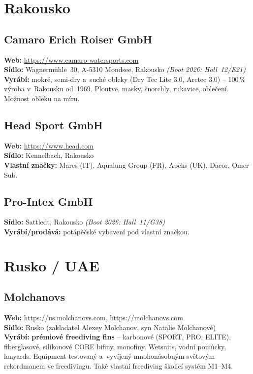 \documentclass[11pt,a4paper]{article}
\begin{document}
\section{Rakousko}

\subsection{Camaro Erich Roiser GmbH}
\textbf{Web:} \url{https://www.camaro-watersports.com} \\
\textbf{Sídlo:} Wagnermühle~30, A-5310 Mondsee, Rakousko \quad\emph{(Boot 2026: Hall~12/E21)} \\
\textbf{Vyrábí:} mokré, semi-dry a~suché obleky (Dry Tec Lite 3.0, Arctec 3.0) -- 100\,\% výroba v~Rakousku od~1969. Ploutve, masky, šnorchly, rukavice, oblečení. Možnost obleku na míru.

\subsection{Head Sport GmbH}
\textbf{Web:} \url{https://www.head.com} \\
\textbf{Sídlo:} Kennelbach, Rakousko \\
\textbf{Vlastní značky:} Mares (IT), Aqualung Group (FR), Apeks (UK), Dacor, Omer Sub.

\subsection{Pro-Intex GmbH}
\textbf{Sídlo:} Sattledt, Rakousko \quad\emph{(Boot 2026: Hall~11/G38)} \\
\textbf{Vyrábí/prodává:} potápěčské vybavení pod vlastní značkou.

\section{Rusko / UAE}

\subsection{Molchanovs}
\textbf{Web:} \url{https://us.molchanovs.com}, \url{https://molchanovs.com} \\
\textbf{Sídlo:} Rusko (zakladatel Alexey Molchanov, syn Natalie Molchanové) \\
\textbf{Vyrábí:} \textbf{prémiové freediving fins} -- karbonové (SPORT, PRO, ELITE), fiberglasové, silikonové CORE bifiny, monofiny. Wetsuits, vodní pomůcky, lanyards. Equipment testovaný a~vyvíjený mnohonásobným světovým rekordmanem ve freedivingu. Také vlastní freediving školicí systém M1--M4.
\end{document}

